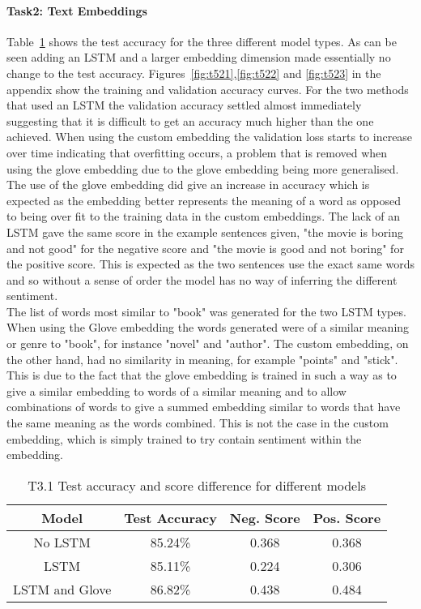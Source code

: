 \documentclass[10pt,twocolumn,letterpaper]{article}
\begin{document}
\paragraph{Task2: Text Embeddings}
Table~\ref{table:t52} shows the test accuracy for the three different model types. As can be seen adding an LSTM and a larger embedding dimension made essentially no change to the test accuracy. Figures~\ref{fig:t521},\ref{fig:t522} and \ref{fig:t523} in the appendix show the training and validation accuracy curves. For the two methods that used an LSTM the validation accuracy settled almost immediately suggesting that it is difficult to get an accuracy much higher than the one achieved. When using the custom embedding the validation loss starts to increase over time indicating that overfitting occurs, a problem that is removed when using the glove embedding due to the glove embedding being more generalised. The use of the glove embedding did give an increase in accuracy which is expected as the embedding better represents the meaning of a word as opposed to being over fit to the training data in the custom embeddings. The lack of an LSTM gave the same score in the example sentences given, "the movie is boring and not good" for the negative score and "the movie is good and not boring" for the positive score. This is expected as the two sentences use the exact same words and so without a sense of order the model has no way of inferring the different sentiment. \\
The list of words most similar to "book" was generated for the two LSTM types. When using the Glove embedding the words generated were of a similar meaning or genre to "book", for instance "novel" and "author". The custom embedding, on the other hand, had no similarity in meaning, for example "points" and "stick". This is due to the fact that the glove embedding is trained in such a way as to give a similar embedding to words of a similar meaning and to allow combinations of words to give a summed embedding similar to words that have the same meaning as the words combined\cite{slides5}. This is not the case in the custom embedding, which is simply trained to try contain sentiment within the embedding.

\begin{table}[ht]
    \small
    \centering
    \begin{tabular}{|c|c|c|c|}
        \hline
        Model     & Test Accuracy & Neg. Score & Pos. Score \\
        \hline
        No LSTM & 85.24\%   & 0.368 & 0.368        \\
        LSTM  & 85.11\%  & 0.224 & 0.306         \\
        LSTM and Glove & 86.82\%   &   0.438 & 0.484     \\
        \hline
    \end{tabular}
    \medbreak
    \caption{T3.1 Test accuracy and score difference for different models}
    \vspace{-1cm}
    \label{table:t52}
\end{table}
\end{document}
